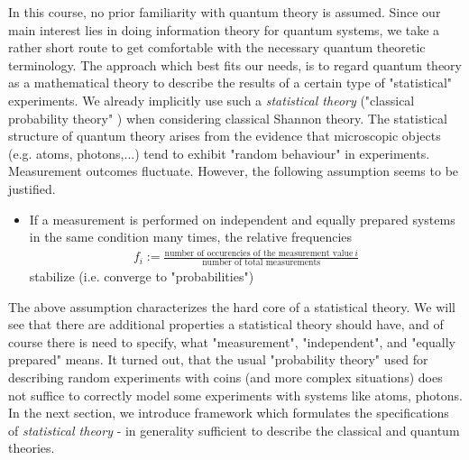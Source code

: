 In this course, no prior familiarity with quantum theory is assumed. Since our main interest lies in doing information theory for quantum systems, we take a rather short route to get comfortable with the necessary quantum theoretic terminology. \newline 
The approach which best fits our needs, is to regard quantum theory as a mathematical theory to describe the results of a certain type of "statistical" experiments. We already implicitly use such a \emph{statistical theory} ("classical probability theory" ) when considering classical Shannon theory. \newline
The statistical structure of quantum theory arises from the evidence that microscopic objects (e.g. atoms, photons,...) tend to exhibit "random behaviour" in experiments. 
Measurement outcomes fluctuate. However, the following assumption seems to be justified.
\begin{itemize} %
	\item If a measurement is performed on independent and equally prepared systems in the same condition many times, the relative frequencies 
	\begin{align*}
	f_i := \frac{\text{number of occurencies of the measurement value} \ i}{\text{number of total measurements}}
	\end{align*}
	stabilize (i.e. converge to "probabilities")
\end{itemize}
The above assumption characterizes the hard core of a statistical theory. We will see that there are additional properties a statistical theory should have, and of course there is need to specify, what "measurement", "independent", and "equally prepared"  means. \newline 
It turned out, that the usual "probability theory" used for describing random experiments with coins (and more complex situations) does not suffice
to correctly model some experiments with systems like atoms, photons. \newline 
In the next section, we introduce framework which formulates the specifications of \emph{statistical theory} - in generality sufficient to describe the classical and quantum theories.
